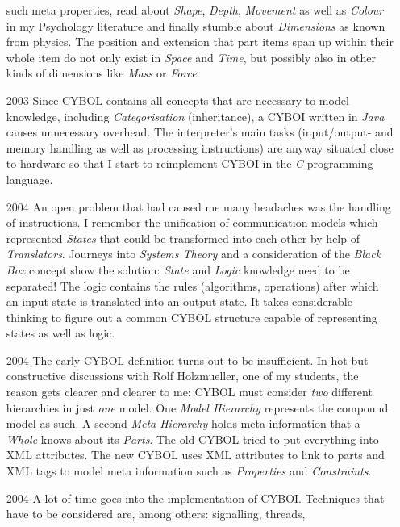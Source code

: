 \begin{itemize}
        such meta properties, read about \emph{Shape}, \emph{Depth},
        \emph{Movement} as well as \emph{Colour} in my Psychology literature
        and finally stumble about \emph{Dimensions} as known from physics. The
        position and extension that part items span up within their whole item
        do not only exist in \emph{Space} and \emph{Time}, but possibly also in
        other kinds of dimensions like \emph{Mass} or \emph{Force}.
    \item[2003] Since CYBOL contains all concepts that are necessary to model
        knowledge, including \emph{Categorisation} (inheritance), a CYBOI written
        in \emph{Java} causes unnecessary overhead. The interpreter's main tasks
        (input/output- and memory handling as well as processing instructions)
        are anyway situated close to hardware so that I start to reimplement
        CYBOI in the \emph{C} programming language.
    \item[2004] An open problem that had caused me many headaches was the
        handling of instructions. I remember the unification of communication
        models which represented \emph{States} that could be transformed into
        each other by help of \emph{Translators}. Journeys into
        \emph{Systems Theory} and a consideration of the \emph{Black Box}
        concept show the solution: \emph{State} and \emph{Logic} knowledge need
        to be separated! The logic contains the rules (algorithms, operations)
        after which an input state is translated into an output state. It takes
        considerable thinking to figure out a common CYBOL structure capable of
        representing states as well as logic.
    \item[2004] The early CYBOL definition turns out to be insufficient. In hot
        but constructive discussions with Rolf Holzmueller, one of my students,
        the reason gets clearer and clearer to me: CYBOL must consider \emph{two}
        different hierarchies in just \emph{one} model. One \emph{Model Hierarchy}
        represents the compound model as such. A second \emph{Meta Hierarchy}
        holds meta information that a \emph{Whole} knows about its \emph{Parts}.
        The old CYBOL tried to put everything into XML attributes. The new CYBOL
        uses XML attributes to link to parts and XML tags to model meta
        information such as \emph{Properties} and \emph{Constraints}.
    \item[2004] A lot of time goes into the implementation of CYBOI. Techniques
        that have to be considered are, among others: signalling, threads,

\end{itemize}

